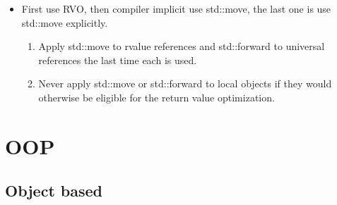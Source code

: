 \documentclass[a4paper,12pt,twoside]{book}
\begin{document}
\begin{itemize}
\item First use RVO, then compiler implicit use std::move, the last one is use std::move explicitly.

\begin{enumerate}
\item Apply std::move to rvalue references and std::forward to universal references
the last time each is used.

\item Never apply std::move or std::forward to local objects if they would otherwise
be eligible for the return value optimization.
\end{enumerate}


\end{itemize}


\chapter{OOP}
\section{Object based}
\end{document}
